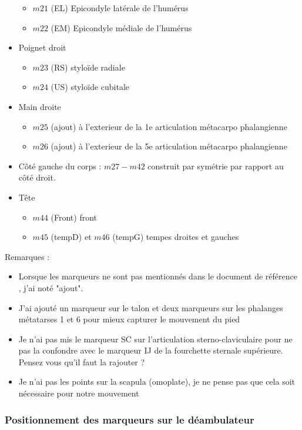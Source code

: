 \documentclass[a4paper, 10pt ]{article}
\begin{document}
\begin{itemize}
\begin{itemize}
\item $m21$ (EL) Epicondyle latérale de l'humérus
\item $m22$ (EM) Epicondyle médiale de l'humérus
\end{itemize}
\item{Poignet droit}
\begin{itemize}
\item $m23$ (RS) styloïde radiale
\item $m24$ (US) styloïde cubitale
\end{itemize}
\item{Main droite}
\begin{itemize}
\item $m25$ (ajout) à l'exterieur de la 1e articulation métacarpo phalangienne
\item $m26$ (ajout) à l'exterieur de la 5e  articulation métacarpo phalangienne
\end{itemize}
\item {Côté gauche du corps} : $m27-m42$ construit par symétrie par rapport au côté droit.
\item {Tête}
\begin{itemize}
\item $m44$ (Front) front
\item $m45$ (tempD) et $m46$ (tempG) tempes droites et gauches
\end{itemize}

\end{itemize}

Remarques :

\begin{itemize}
\item Lorsque les marqueurs ne sont pas mentionnés dans le document de référence \cite{Wu02, Wu05}, j'ai noté "ajout".
\item J'ai ajouté un marqueur sur le talon et deux marqueurs sur les phalanges métatarses 1 et 6  pour mieux capturer le mouvement du pied
\item Je n'ai pas mis le marqueur SC sur l'articulation sterno-claviculaire pour ne pas la confondre avec le marqueur IJ de la fourchette sternale supérieure. Pensez vous qu'il faut la rajouter ?
\item Je n'ai pas les points sur la scapula (omoplate), je ne pense pas que cela soit nécessaire pour notre mouvement
\end{itemize}

\subsubsection{Positionnement des marqueurs sur le déambulateur }
\end{document}
